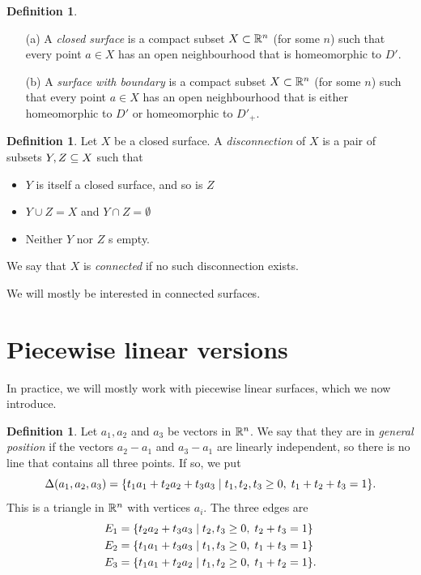 \documentclass[reqno]{amsart}
\theoremstyle{definition}
\newtheorem{definition}[theorem]{Definition}
\begin{document}
\begin{definition}\leavevmode
 \begin{itemize}
  \item[(a)] A \emph{closed surface} is a compact subset
   $X\subset\mathbb{R}^n$ (for some $n$) such that every point $a\in X$ has an
   open neighbourhood that is homeomorphic to $D'$.
  \item[(b)] A \emph{surface with boundary} is a compact subset
   $X\subset\mathbb{R}^n$ (for some $n$) such that every point $a\in X$ has an
   open neighbourhood that is either homeomorphic to $D'$ or
   homeomorphic to $D'_+$.
 \end{itemize}
\end{definition}

\begin{definition}
 Let $X$ be a closed surface.  A \emph{disconnection} of $X$ is a pair
 of subsets $Y,Z\subseteq X$ such that 
 \begin{itemize}
  \item $Y$ is itself a closed surface, and so is $Z$
  \item $Y\cup Z=X$ and $Y\cap Z=\emptyset$
  \item Neither $Y$ nor $Z$ s empty.
 \end{itemize}
 We say that $X$ is \emph{connected} if no such disconnection exists.
\end{definition}

We will mostly be interested in connected surfaces.

\section{Piecewise linear versions}
\label{sec-surf-pl}

In practice, we will mostly work with piecewise linear surfaces, which
we now introduce.  

\begin{definition}
 Let $a_1,a_2$ and $a_3$ be vectors in $\mathbb{R}^n$.  We say that they are
 in \emph{general position} if the vectors $a_2-a_1$ and $a_3-a_1$ are
 linearly independent, so there is no line that contains all three
 points.  If so, we put
 \[ \Delta(a_1,a_2,a_3) = \{t_1a_1+t_2a_2+t_3a_3\;|\; 
     t_1,t_2,t_3\geq 0,\; t_1+t_2+t_3=1\}.
 \]
 This is a triangle in $\mathbb{R}^n$ with vertices $a_i$.  The three edges
 are 
 \begin{align*}
  E_1 &= \{t_2a_2+t_3a_3\;|\; t_2,t_3\geq 0,\; t_2+t_3=1\} \\
  E_2 &= \{t_1a_1+t_3a_3\;|\; t_1,t_3\geq 0,\; t_1+t_3=1\} \\
  E_3 &= \{t_1a_1+t_2a_2\;|\; t_1,t_2\geq 0,\; t_1+t_2=1\}.
 \end{align*}
\end{definition}
\end{document}
